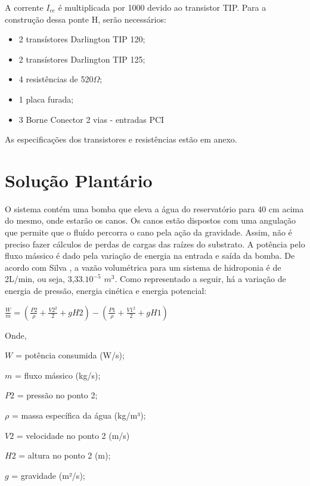 A corrente $I_{ce}$ é multiplicada por 1000 devido ao transistor TIP. Para a construção dessa ponte H, serão necessários:

\begin{itemize}
	
	\item 2 transístores Darlington TIP 120;
	\item 2 transístores Darlington TIP 125;
	\item 4 resistências de 520$\Omega$;
	\item 1 placa furada;
	\item 3 Borne Conector 2 vias - entradas PCI
	
\end{itemize}

As especificações dos transistores e resistências estão em anexo.

\section{Solução Plantário}

O sistema contém uma bomba que eleva a água do reservatório para 40 cm acima do mesmo, onde estarão os canos. Os canos estão dispostos com uma angulação que permite que o fluído percorra o cano pela ação da gravidade. Assim, não é preciso fazer cálculos de perdas de cargas das raízes do substrato. A potência pelo fluxo mássico é dado pela variação de energia na entrada e saída da bomba. De acordo com Silva \cite{SILVA}, a vazão volumétrica para um sistema de hidroponia é de 2L/min, ou seja, 3,33.$10^{-5}$ $m^3$. Como representado a seguir, há a variação de energia de pressão, energia cinética e energia potencial:

\begin{center}
	${\displaystyle\frac{W}{m} = (\frac{P2}{\rho} + \frac{V2^2}{2} + gH2) - (\frac{P1}{\rho} + \frac{V1^2}{2} + gH1)}$	
\end{center}

Onde,

$W$ = potência consumida (W/s);

$m$ = fluxo mássico (kg/s);

$P2$ = pressão no ponto 2;

$\rho$ = massa específica da água (kg/m³);

$V2$ = velocidade no ponto 2 (m/s)

$H2$ = altura no ponto 2 (m);

$g$ = gravidade (m²/s);

